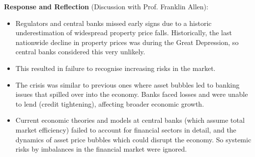   
\textbf{Response and Reflection} (Discussion with Prof. Franklin Allen):
\begin{itemize}
    \item Regulators and central banks missed early signs due to a historic underestimation of widespread property price falls. Historically, the last nationwide decline in property prices was during the Great Depression, so central banks considered this very unlikely. 
    \item This resulted in failure to recognise increasing risks in the market.
    \item The crisis was similar to previous ones where asset bubbles led to banking issues that spilled over into the economy. Banks faced losses and were unable to lend (credit tightening), affecting broader economic growth.
    \item Current economic theories and models at central banks (which assume total market efficiency) failed to account for financial sectors in detail, and the dynamics of asset price bubbles which could disrupt the economy. So systemic risks by imbalances in the financial market were ignored.
\end{itemize}




